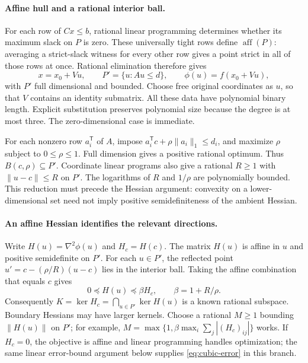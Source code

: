 \paragraph{Affine hull and a rational interior ball.}
For each row of $Cx\le b$, rational linear programming determines
whether its maximum slack on $P$ is zero. These universally tight
rows define $\operatorname{aff}(P)$: averaging a strict-slack witness
for every other row gives a point strict in all of those rows at once.
Rational elimination therefore gives
\[
 x=x_0+Vu,\qquad P'=\{u:Au\le d\},\qquad
 \phi(u)=f(x_0+Vu),
\]
with $P'$ full dimensional and bounded. Choose free original
coordinates as $u$, so that $V$ contains an identity submatrix.
All these data have polynomial binary length. Explicit substitution
preserves polynomial size because the degree is at most three.
The zero-dimensional case is immediate.

For each nonzero row $a_i^{\mathsf T}$ of $A$, impose
$a_i^{\mathsf T}c+\rho\|a_i\|_1\le d_i$, and maximize
$\rho$ subject to $0\le\rho\le1$. Full dimension gives a positive
rational optimum. Thus $B(c,\rho)\subseteq P'$. Coordinate linear
programs also give a rational $R\ge1$ with
$\|u-c\|\le R$ on $P'$. The logarithms of $R$ and $1/\rho$
are polynomially bounded. This reduction must precede the Hessian
argument: convexity on a lower-dimensional set need not imply
positive semidefiniteness of the ambient Hessian.

\paragraph{An affine Hessian identifies the relevant directions.}
Write $H(u)=\nabla^2\phi(u)$ and $H_c=H(c)$. The matrix $H(u)$
is affine in $u$ and positive semidefinite on $P'$. For each
$u\in P'$, the reflected point
$u'=c-(\rho/R)(u-c)$ lies in the interior ball. Taking the affine
combination that equals $c$ gives
\begin{equation}
 0\preceq H(u)\preceq\beta H_c,\qquad
 \beta=1+R/\rho.
 \label{eq:cubic-domination}
\end{equation}
Consequently
$K=\ker H_c=\bigcap_{u\in P'}\ker H(u)$ is a known rational
subspace. Boundary Hessians may have larger kernels. Choose a rational
$M\ge1$ bounding $\|H(u)\|$ on $P'$; for example,
$M=\max\{1,\beta\max_i\sum_j|(H_c)_{ij}|\}$ works.
If $H_c=0$, the objective is affine and linear programming handles
optimization; the same linear error-bound argument below supplies
\eqref{eq:cubic-error} in this branch.


